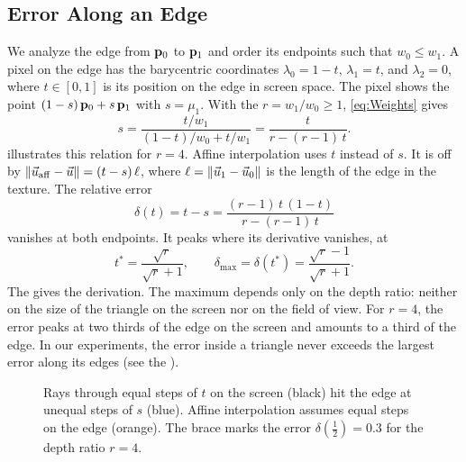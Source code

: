 \subsection{Error Along an Edge}\label{sec:EdgeError}
We analyze the edge from $\mathbf{p}_0$ to $\mathbf{p}_1$ and order its endpoints such that $w_0 \le w_1$.
A pixel on the edge has the barycentric coordinates $\lambda_0 = 1 - t$, $\lambda_1 = t$, and $\lambda_2 = 0$, where $t\in[0,1]$ is its position on the edge in screen space.
The pixel shows the point $(1 - s)\,\mathbf{p}_0 + s\,\mathbf{p}_1$ with $s = \mu_1$.
With the  $r = w_1 / w_0 \ge 1$, \cref{eq:Weights} gives
\begin{equation}
    s = \frac{t / w_1}{(1 - t) / w_0 + t / w_1} = \frac{t}{r - (r - 1)\,t}.
\end{equation}
 illustrates this relation for $r = 4$.
Affine interpolation uses $t$ instead of $s$.
It is off by $\Vert \vec{u}_\mathrm{aff} - \vec{u} \Vert = (t - s)\,\ell$, where $\ell = \Vert \vec{u}_1 - \vec{u}_0 \Vert$ is the length of the edge in the texture.
The relative error
\begin{equation}
    \delta(t) = t - s = \frac{(r - 1)\,t\,(1 - t)}{r - (r - 1)\,t}
\end{equation}
vanishes at both endpoints.
It peaks where its derivative vanishes, at
\begin{equation}
    t^\ast = \frac{\sqrt{r}}{\sqrt{r} + 1},
    \qquad
    \delta_\mathrm{max} = \delta(t^\ast) = \frac{\sqrt{r} - 1}{\sqrt{r} + 1}.
    \label{eq:MaxError}
\end{equation}
The \SupplementalName{} gives the derivation.
The maximum depends only on the depth ratio: neither on the size of the triangle on the screen nor on the field of view.
For $r = 4$, the error peaks at two thirds of the edge on the screen and amounts to a third of the edge.
In our experiments, the error inside a triangle never exceeds the largest error along its edges (see the \SupplementalName).

\begin{figure}[t]
    \centering
    
    \caption{
        Rays through equal steps of $t$ on the screen (black) hit the edge at unequal steps of $s$ (blue).
        Affine interpolation assumes equal steps on the edge (orange).
        The brace marks the error $\delta(\tfrac{1}{2}) = 0.3$ for the depth ratio $r = 4$.
    }
    \label{fig:EdgeDiagram}
\end{figure}

